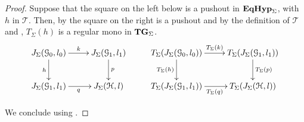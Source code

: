 \documentclass[a4paper,UKenglish,cleveref,pdftex,thm-restate,numberwithinsect]{lipics-v2021}
\newcommand{\catname}[1]{\textbf{\textup{#1}}}
\newcommand{\EqHyp}{\catname{EqHyp}} %
\newcommand{\tg}[0]{\catname{TG}_{\Sigma}}
\begin{document}
\po*
\begin{proof}\label{proof:tade}
	Suppose that the square on the left below is a pushout in $\EqHyp_\Sigma$, with $h$ in $\mathcal{T}$. Then, by  the square on the right is a pushout and by the definition of $\mathcal{T}$ and , $T_\Sigma(h)$ is a regular mono in $\tg$.
	\[\xymatrix{J_\Sigma(\mathcal{G}_0, l_0) \ar[r]^{k} \ar[d]_{h}& J_\Sigma(\mathcal{G}_1, l_1) \ar[d]^{p} &T_\Sigma (J_\Sigma(\mathcal{G}_0, l_0)) \ar[r]^{T_{\Sigma}(k)} \ar[d]_{T_{\Sigma}(h)}& T_\Sigma (J_\Sigma(\mathcal{G}_1, l_1)) \ar[d]^{T_\Sigma(p)}\\
J_\Sigma(\mathcal{G}_1, l_1) \ar[r]_{q}& J_\Sigma(\mathcal{H}, l) & T_\Sigma(J_\Sigma(\mathcal{G}_1, l_1)) \ar[r]_{T_\Sigma(q)}& T_\Sigma(J_\Sigma(\mathcal{H}, l))}\]
	
	We conclude using .
\end{proof}
\end{document}
